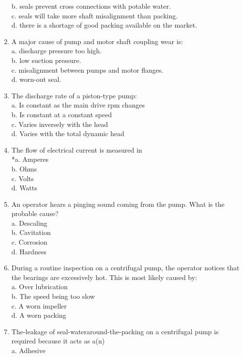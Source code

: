 \begin{enumerate}[1.]
b. seals prevent cross connections with potable water.\\
c. seals will take more shaft misalignment than packing.\\
d. there is a shortage of good packing available on the market.
\item A major cause of pump and motor shaft coupling wear is:\\
a. discharge pressure too high.\\
b. low suction pressure.\\
c. misalignment between pumps and motor flanges.\\
d. worn-out seal.\\
\item The discharge rate of a piston-type pump:\\
a. Is constant as the main drive rpm changes\\
b. Is constant at a constant speed\\
c. Varies inversely with the head\\
d. Varies with the total dynamic head\\
\item The flow of electrical current is measured in\\
*a. Amperes\\
b. Ohms\\
c. Volts\\
d. Watts\\
\item An operator hears a pinging sound coming from the pump. What is the probable cause?\\
a. Descaling\\
b. Cavitation\\
c. Corrosion\\
d. Hardness\\
\item During a routine inspection on a centrifugal pump, the operator notices that the bearings are excessively hot. This is most likely caused by:\\
a. Over lubrication\\
b. The speed being too slow\\
c. A worn impeller\\
d. A worn packing\\
\item The-leakage of seal-wateraround-the-packing on a centrifugal pump is required because it acts as a(n)\\
a. Adhesive\\

\end{enumerate}

